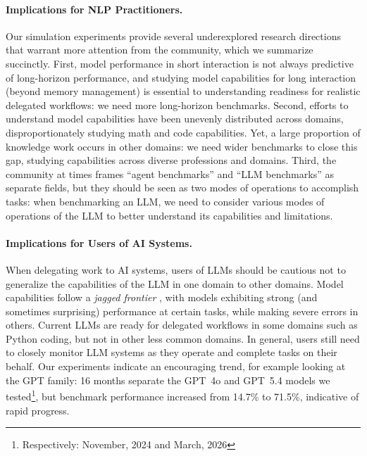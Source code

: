 \documentclass{article} %
\begin{document}
\paragraph{Implications for NLP Practitioners.} Our simulation experiments provide several underexplored research directions that warrant more attention from the community, which we summarize succinctly. First, model performance in short interaction is not always predictive of long-horizon performance, and studying model capabilities for long interaction (beyond memory management) is essential to understanding readiness for realistic delegated workflows: we need more long-horizon benchmarks. Second, efforts to understand model capabilities have been unevenly distributed across domains, disproportionately studying math and code capabilities. Yet, a large proportion of knowledge work occurs in other domains: we need wider benchmarks to close this gap, studying capabilities across diverse professions and domains. Third, the community at times frames ``agent benchmarks'' and ``LLM benchmarks'' as separate fields, but they should be seen as two modes of operations to accomplish tasks: when benchmarking an LLM, we need to consider various modes of operations of the LLM to better understand its capabilities and limitations.

\paragraph{Implications for Users of AI Systems.} When delegating work to AI systems, users of LLMs should be cautious not to generalize the capabilities of the LLM in one domain to other domains. Model capabilities follow a \textit{jagged frontier} \citep{DellAcqua2023NavigatingTJ}, with models exhibiting strong (and sometimes surprising) performance at certain tasks, while making severe errors in others. Current LLMs are ready for delegated workflows in some domains such as Python coding, but not in other less common domains. In general, users still need to closely monitor LLM systems as they operate and complete tasks on their behalf. Our experiments indicate an encouraging trend, for example looking at the GPT family: 16 months separate the GPT~4o and GPT~5.4 models we tested\footnote{Respectively: November, 2024 and March, 2026}, but benchmark performance increased from 14.7\% to 71.5\%, indicative of rapid progress.
\end{document}
